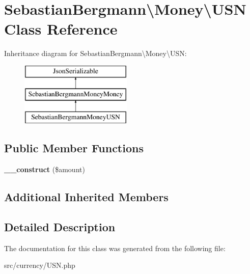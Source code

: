 \hypertarget{classSebastianBergmann_1_1Money_1_1USN}{}\section{Sebastian\+Bergmann\textbackslash{}Money\textbackslash{}U\+S\+N Class Reference}
\label{classSebastianBergmann_1_1Money_1_1USN}
Inheritance diagram for Sebastian\+Bergmann\textbackslash{}Money\textbackslash{}U\+S\+N\+:\begin{figure}[H]
\begin{center}
\leavevmode
\includegraphics[height=3.000000cm]{classSebastianBergmann_1_1Money_1_1USN}
\end{center}
\end{figure}
\subsection*{Public Member Functions}
\begin{DoxyCompactItemize}
\item 
\hypertarget{classSebastianBergmann_1_1Money_1_1USN_adb91cd8027f3a8eefe5ba069fcd81ef7}{}{\bfseries \+\_\+\+\_\+construct} (\$amount)\label{classSebastianBergmann_1_1Money_1_1USN_adb91cd8027f3a8eefe5ba069fcd81ef7}

\end{DoxyCompactItemize}
\subsection*{Additional Inherited Members}


\subsection{Detailed Description}


The documentation for this class was generated from the following file\+:\begin{DoxyCompactItemize}
\item 
src/currency/U\+S\+N.\+php\end{DoxyCompactItemize}
